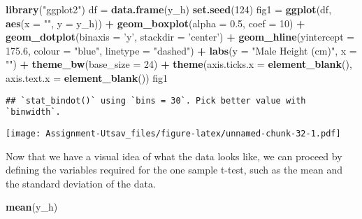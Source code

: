 \documentclass[
]{article}
\newenvironment{Shaded}{\begin{snugshade}}{\end{snugshade}}
\newcommand{\DataTypeTok}[1]{\textcolor[rgb]{0.13,0.29,0.53}{#1}}
\newcommand{\DecValTok}[1]{\textcolor[rgb]{0.00,0.00,0.81}{#1}}
\newcommand{\FloatTok}[1]{\textcolor[rgb]{0.00,0.00,0.81}{#1}}
\newcommand{\KeywordTok}[1]{\textcolor[rgb]{0.13,0.29,0.53}{\textbf{#1}}}
\newcommand{\NormalTok}[1]{#1}
\newcommand{\OperatorTok}[1]{\textcolor[rgb]{0.81,0.36,0.00}{\textbf{#1}}}
\newcommand{\StringTok}[1]{\textcolor[rgb]{0.31,0.60,0.02}{#1}}
\begin{document}
\begin{Shaded}
\begin{Highlighting}[]
\KeywordTok{library}\NormalTok{(}\StringTok{"ggplot2"}\NormalTok{)}
\NormalTok{df =}\StringTok{ }\KeywordTok{data.frame}\NormalTok{(y_h)}
\KeywordTok{set.seed}\NormalTok{(}\DecValTok{124}\NormalTok{)}
\NormalTok{fig1 =}\StringTok{ }\KeywordTok{ggplot}\NormalTok{(df, }\KeywordTok{aes}\NormalTok{(}\DataTypeTok{x =} \StringTok{""}\NormalTok{, }\DataTypeTok{y =}\NormalTok{ y_h)) }\OperatorTok{+}
\StringTok{  }\KeywordTok{geom_boxplot}\NormalTok{(}\DataTypeTok{alpha =} \FloatTok{0.5}\NormalTok{, }\DataTypeTok{coef =} \DecValTok{10}\NormalTok{) }\OperatorTok{+}
\StringTok{  }\KeywordTok{geom_dotplot}\NormalTok{(}\DataTypeTok{binaxis =} \StringTok{'y'}\NormalTok{,}
               \DataTypeTok{stackdir =} \StringTok{'center'}\NormalTok{) }\OperatorTok{+}
\StringTok{  }\KeywordTok{geom_hline}\NormalTok{(}\DataTypeTok{yintercept =} \FloatTok{175.6}\NormalTok{,}
             \DataTypeTok{colour =} \StringTok{"blue"}\NormalTok{,}
             \DataTypeTok{linetype =} \StringTok{"dashed"}\NormalTok{) }\OperatorTok{+}
\StringTok{  }\KeywordTok{labs}\NormalTok{(}\DataTypeTok{y =} \StringTok{"Male Height (cm)"}\NormalTok{, }\DataTypeTok{x =} \StringTok{""}\NormalTok{) }\OperatorTok{+}\StringTok{ }
\StringTok{  }\KeywordTok{theme_bw}\NormalTok{(}\DataTypeTok{base_size =} \DecValTok{24}\NormalTok{) }\OperatorTok{+}
\StringTok{  }\KeywordTok{theme}\NormalTok{(}\DataTypeTok{axis.ticks.x =} \KeywordTok{element_blank}\NormalTok{(),}
        \DataTypeTok{axis.text.x =} \KeywordTok{element_blank}\NormalTok{())}
\NormalTok{fig1}
\end{Highlighting}
\end{Shaded}

\begin{verbatim}
## `stat_bindot()` using `bins = 30`. Pick better value with `binwidth`.
\end{verbatim}

\texttt{[image: Assignment-Utsav\_files/figure-latex/unnamed-chunk-32-1.pdf]}

Now that we have a visual idea of what the data looks like, we can
proceed by defining the variables required for the one sample t-test,
such as the mean and the standard deviation of the data.

\begin{Shaded}
\begin{Highlighting}[]
\KeywordTok{mean}\NormalTok{(y_h)}
\end{Highlighting}
\end{Shaded}
\end{document}
